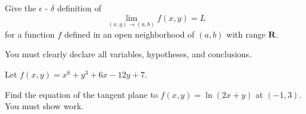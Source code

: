 \documentclass[addpoints]{exam}
\begin{document}
\begin{questions}
\question[20] Give the $\epsilon$ - $\delta$ definition of 
\[
	\lim _{(x,y) \to (a,b)} f(x,y) = L
\]
for a function $f$ defined in an open neighborhood of $(a,b)$ with range $\mathbf{R}$. 

You must clearly declare all variables, hypotheses, and conclusions. 

\question Let $f(x,y) = x^6 + y^3 + 6x - 12y + 7$.

\question[20] Find the equation of the tangent plane to $f(x,y) = \ln (2x + y)$ at $(-1,3)$. You must show work. 

\end{questions}
\end{document}
